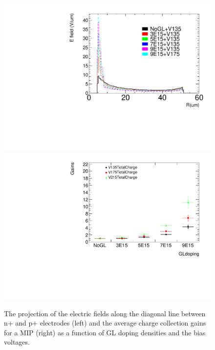 \documentclass[aps,pt14,superscriptaddress,showpacs,floatfix,nofootinbib]{revtex4}
\begin{document}
\begin{figure}[hbtp]
\begin{center}
\includegraphics[width=0.35\textheight,keepaspectratio]{figures/Electric_field_IBLGAD5E_summary.pdf}
\includegraphics[width=0.35\textheight,keepaspectratio]{figures/Anatiming_timing3DIBLGAD5E_Plots_TotalChargeGLdoping.pdf}
\caption{The projection of the electric fields along the diagonal line between n+ and p+ electrodes (left) and 
the average charge collection gains for a MIP (right) as a function of GL doping densities and the bias voltages.~\label{fig:kdetgain}}
\end{center}
\end{figure}
\end{document}
